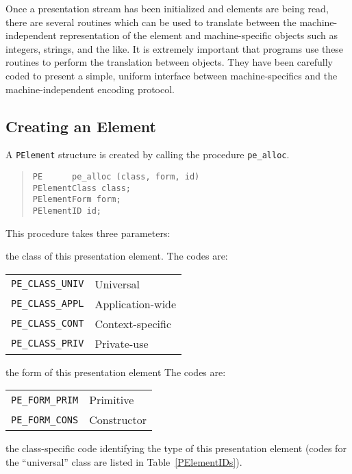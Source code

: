 Once a presentation stream has been initialized and elements are being read,
there are several routines which can be used to translate between the
machine-independent representation of the element and machine-specific
objects such as integers, strings, and the like.
It is extremely important that programs use these routines to perform the
translation between objects.
They have been carefully coded to present a simple, uniform interface between
machine-specifics and the machine-independent encoding protocol.

\subsection	{Creating an Element}
A \verb"PElement" structure is created by calling the procedure
\verb"pe_alloc".
\begin{quote}\small\begin{verbatim}
PE      pe_alloc (class, form, id)
PElementClass class;
PElementForm form;
PElementID id;
\end{verbatim}\end{quote}
This procedure takes three parameters:
\begin{describe}
\item[\verb"class":] the class of this presentation element.
The codes are:

\begin{tabular}{rp{3.0in}}
\tt PE\_CLASS\_UNIV&	Universal\\
\tt PE\_CLASS\_APPL&	Application-wide\\
\tt PE\_CLASS\_CONT&	Context-specific\\
\tt PE\_CLASS\_PRIV&	Private-use
\end{tabular}

\item[\verb"form":] the form of this presentation element
The codes are:

\begin{tabular}{rp{3.0in}}
\tt PE\_FORM\_PRIM&	Primitive\\
\tt PE\_FORM\_CONS&	Constructor
\end{tabular}

\item[\verb"id":] the class-specific code identifying the type of this
presentation element
(codes for the ``universal'' class are listed in Table~\ref{PElementIDs}).
\end{describe}

